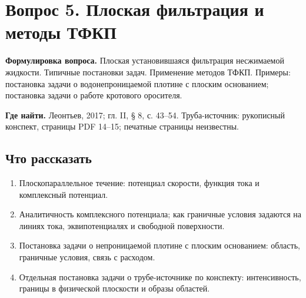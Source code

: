 \documentclass[12pt,a4paper]{article}
\newcounter{questionnumber}
\begin{document}
\clearpage
\setcounter{questionnumber}{5}
\setcounter{equation}{0}
\setcounter{footnote}{0}
\section*{Вопрос 5. Плоская фильтрация и методы ТФКП}
\textbf{Формулировка вопроса.} Плоская установившаяся фильтрация несжимаемой жидкости. Типичные постановки задач. Применение методов ТФКП. Примеры: постановка задачи о водонепроницаемой плотине с плоским основанием; постановка задачи о работе кротового оросителя.

\medskip
\textbf{Где найти.} Леонтьев, 2017; гл. II, § 8, с. 43--54. Труба-источник: рукописный конспект, страницы PDF 14--15; печатные страницы неизвестны.

\subsection*{Что рассказать}
\begin{enumerate}
\item Плоскопараллельное течение: потенциал скорости, функция тока и комплексный потенциал.
\item Аналитичность комплексного потенциала; как граничные условия задаются на линиях тока, эквипотенциалях и свободной поверхности.
\item Постановка задачи о непроницаемой плотине с плоским основанием: область, граничные условия, связь с расходом.
\item Отдельная постановка задачи о трубе-источнике по конспекту: интенсивность, границы в физической плоскости и образы областей.
\end{enumerate}
\end{document}
